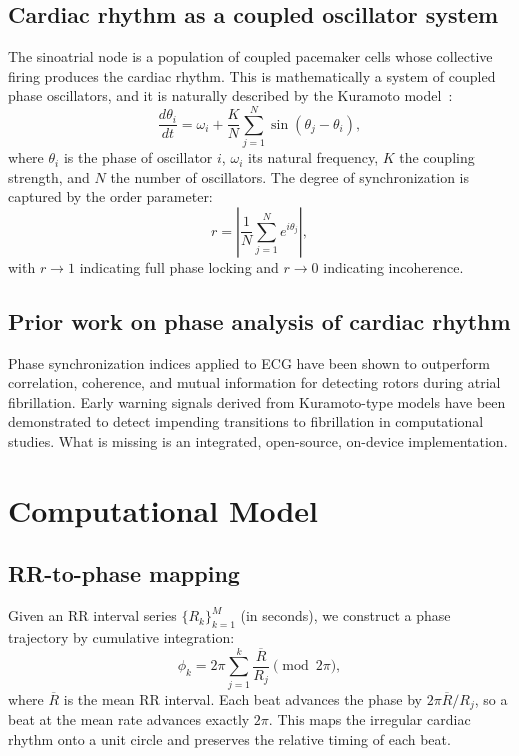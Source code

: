 \documentclass[11pt]{article}
\begin{document}
\subsection{Cardiac rhythm as a coupled oscillator system}

The sinoatrial node is a population of coupled pacemaker cells whose
collective firing produces the cardiac rhythm. This is mathematically a
system of coupled phase oscillators, and it is naturally described by
the Kuramoto model~\cite{kuramoto1975,acebron2005}:
\begin{equation}
\frac{d\theta_i}{dt} = \omega_i + \frac{K}{N}\sum_{j=1}^{N}
\sin(\theta_j - \theta_i),
\label{eq:kuramoto}
\end{equation}
where $\theta_i$ is the phase of oscillator $i$, $\omega_i$ its natural
frequency, $K$ the coupling strength, and $N$ the number of
oscillators. The degree of synchronization is captured by the order
parameter:
\begin{equation}
r = \left| \frac{1}{N} \sum_{j=1}^{N} e^{i\theta_j} \right|,
\label{eq:orderparam}
\end{equation}
with $r \to 1$ indicating full phase locking and $r \to 0$ indicating
incoherence.

\subsection{Prior work on phase analysis of cardiac rhythm}

Phase synchronization indices applied to ECG have been shown to
outperform correlation, coherence, and mutual information for detecting
rotors during atrial fibrillation. Early warning signals derived from
Kuramoto-type models have been demonstrated to detect impending
transitions to fibrillation in computational studies. What is missing
is an integrated, open-source, on-device implementation.

\section{Computational Model}\label{sec:model}

\subsection{RR-to-phase mapping}

Given an RR interval series $\{R_k\}_{k=1}^{M}$ (in seconds), we
construct a phase trajectory by cumulative integration:
\begin{equation}
\phi_k = 2\pi \sum_{j=1}^{k} \frac{\overline{R}}{R_j} \pmod{2\pi},
\label{eq:rrphase}
\end{equation}
where $\overline{R}$ is the mean RR interval. Each beat advances the
phase by $2\pi \overline{R}/R_j$, so a beat at the mean rate advances
exactly $2\pi$. This maps the irregular cardiac rhythm onto a unit
circle and preserves the relative timing of each beat.
\end{document}
